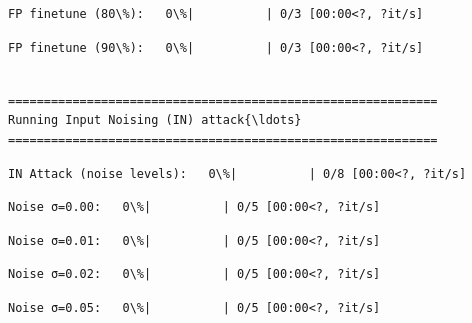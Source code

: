 \documentclass[11pt]{article}
\begin{document}
    
    
    \begin{Verbatim}[commandchars=\\\{\}]
FP finetune (80\%):   0\%|          | 0/3 [00:00<?, ?it/s]
    \end{Verbatim}

    
    
    \begin{Verbatim}[commandchars=\\\{\}]
FP finetune (90\%):   0\%|          | 0/3 [00:00<?, ?it/s]
    \end{Verbatim}

    
    \begin{Verbatim}[commandchars=\\\{\}]

============================================================
Running Input Noising (IN) attack{\ldots}
============================================================
    \end{Verbatim}

    
    \begin{Verbatim}[commandchars=\\\{\}]
IN Attack (noise levels):   0\%|          | 0/8 [00:00<?, ?it/s]
    \end{Verbatim}

    
    
    \begin{Verbatim}[commandchars=\\\{\}]
Noise σ=0.00:   0\%|          | 0/5 [00:00<?, ?it/s]
    \end{Verbatim}

    
    
    \begin{Verbatim}[commandchars=\\\{\}]
Noise σ=0.01:   0\%|          | 0/5 [00:00<?, ?it/s]
    \end{Verbatim}

    
    
    \begin{Verbatim}[commandchars=\\\{\}]
Noise σ=0.02:   0\%|          | 0/5 [00:00<?, ?it/s]
    \end{Verbatim}

    
    
    \begin{Verbatim}[commandchars=\\\{\}]
Noise σ=0.05:   0\%|          | 0/5 [00:00<?, ?it/s]
    \end{Verbatim}
\end{document}
